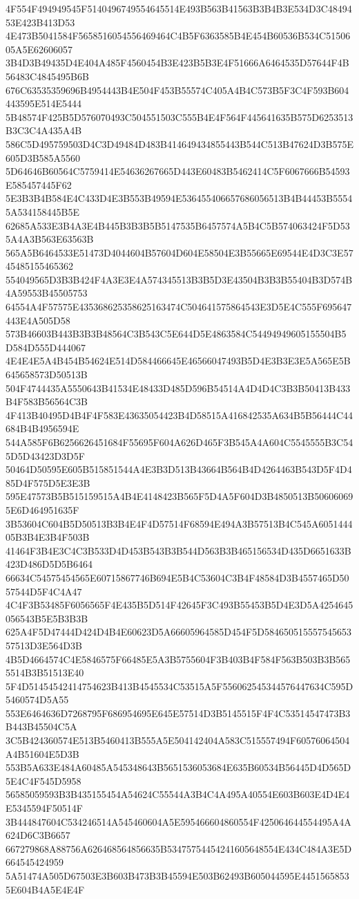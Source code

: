 {{{{{{{{{{{{{{{{{{{{{4F554F494949545F5140496749554645514E493B563B41563B3B4B3E534D3C4849453E423B413D53
4E473B5041584F5658516054556469464C4B5F6363585B4E454B60536B534C5150605A5E62606057
3B4D3B49435D4E404A485F4560454B3E423B5B3E4F51666A6464535D57644F4B56483C4845495B6B
676C63535359696B4954443B4E504F453B55574C405A4B4C573B5F3C4F593B604443595E514E5444
5B48574F425B5D576070493C504551503C555B4E4F564F445641635B575D6253513B3C3C4A435A4B
586C5D495759503D4C3D49484D483B414649434855443B544C513B47624D3B575E605D3B585A5560
5D64646B60564C5759414E54636267665D443E60483B5462414C5F6067666B54593E585457445F62
5E3B3B4B584E4C433D4E3B553B49594E536455406657686056513B4B44453B55545A534158445B5E
62685A533E3B4A3E4B445B3B3B5B5147535B6457574A5B4C5B574063424F5D535A4A3B563E63563B
565A5B6464533E51473D4044604B57604D604E58504E3B55665E69544E4D3C3E5745485155465362
554049565D3B3B424F4A3E3E4A574345513B3B5D3E43504B3B3B55404B3D574B4A59553B45505753
64554A4F57575E435368625358625163474C504641575864543E3D5E4C555F695647443E4A505D58
573B46603B443B3B3B48564C3B543C5E644D5E4863584C54494949605155504B5D584D555D444067
4E4E4E5A4B454B54624E514D584466645E46566047493B5D4E3B3E3E5A565E5B645658573D50513B
504F4744435A5550643B41534E48433D485D596B54514A4D4D4C3B3B50413B433B4F583B56564C3B
4F413B40495D4B4F4F583E43635054423B4D58515A416842535A634B5B56444C44684B4B4956594E
544A585F6B6256626451684F55695F604A626D465F3B545A4A604C5545555B3C545D5D43423D3D5F
50464D50595E605B515851544A4E3B3D513B43664B564B4D4264463B543D5F4D485D4F575D5E3E3B
595E47573B5B515159515A4B4E4148423B565F5D4A5F604D3B4850513B506060695E6D464951635F
3B53604C604B5D50513B3B4E4F4D57514F68594E494A3B57513B4C545A605144405B3B4E3B4F503B
41464F3B4E3C4C3B533D4D453B543B3B544D563B3B465156534D435D6651633B423D486D5D5B6464
66634C54575454565E60715867746B694E5B4C53604C3B4F48584D3B4557465D5057544D5F4C4A47
4C4F3B53485F6056565F4E435B5D514F42645F3C493B55453B5D4E3D5A4254645056543B5E5B3B3B
625A4F5D47444D424D4B4E60623D5A66605964585D454F5D58465051555754565357513D3E564D3B
4B5D4664574C4E5846575F66485E5A3B5755604F3B403B4F584F563B503B3B5655514B3B51513E40
5F4D51454542414754623B413B4545534C53515A5F556062545344576447634C595D5460574D5A55
553E6464636D7268795F686954695E645E57514D3B5145515F4F4C53514547473B3B443B45504C5A
3C5B424360574E513B5460413B555A5E504142404A583C515557494F60576064504A4B51604E5D3B
553B5A633E484A60485A545348643B5651536053684E635B60534B56445D4D565D5E4C4F545D5958
56585059593B3B435155454A54624C55544A3B4C4A495A40554E603B603E4D4E4E5345594F50514F
3B444847604C534246514A545460604A5E595466604860554F425064644554495A4A624D6C3B6657
667279868A88756A626468564856635B53475754454241605648554E434C484A3E5D664545424959
5A51474A505D67503E3B603B473B3B45594E503B62493B605044595E44515658535E604B4A5E4E4F
}}}}}}}}}}}}}}}}}}}}}
